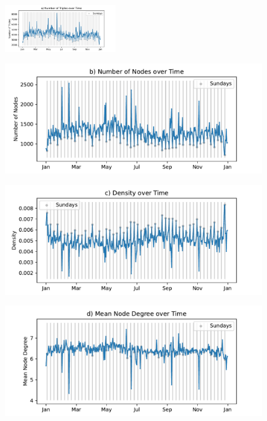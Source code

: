 \begin{figure}[!t]
\begin{minipage}{\textwidth}
	\centering
	\includegraphics[width=0.43\textwidth]{figs/acled_subset_gta_aggregatedNumber of Triples.pdf}\\
\end{minipage}
\begin{minipage}{0.43\textwidth}
	\centering
	\includegraphics[width=\textwidth]{figs/acled_subset_gta_aggregatedNumber of Nodes.pdf}\\
\end{minipage}
\hfill
\begin{minipage}{0.43\textwidth}
	\centering
	\includegraphics[width=\textwidth]{figs/acled_subset_gta_aggregatedDensity.pdf}\\
\end{minipage}
\begin{minipage}{0.43\textwidth}
	\centering
	\includegraphics[width=\textwidth]{figs/acled_subset_gta_aggregatedMean Node Degree.pdf}\\

\end{minipage}
\end{figure}
